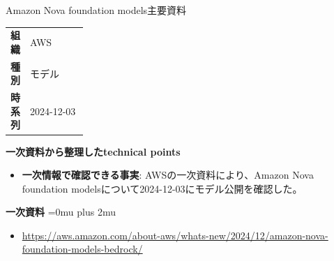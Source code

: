 \begin{technicalnote}{Amazon Nova foundation models}{主要資料}
\begingroup
\begin{tabularx}{\linewidth}{@{}>{\bfseries}p{0.22\linewidth}X@{}}
組織 & AWS \\
種別 & モデル \\
時系列 & 2024-12-03 \\
\end{tabularx}
\smallskip
{\bfseries 一次資料から整理したtechnical points}
\begin{itemize}[leftmargin=1.5em,itemsep=0.35em]
\item \textbf{一次情報で確認できる事実}: AWSの一次資料により、Amazon Nova foundation modelsについて2024-12-03にモデル公開を確認した。
\end{itemize}
\begin{minipage}{\linewidth}
\begin{samepage}
{\bfseries 一次資料}
\begingroup\sloppy
\Urlmuskip=0mu plus 2mu\relax
\begin{itemize}[leftmargin=1.5em,itemsep=0.25em]
\item {\scriptsize\url{https://aws.amazon.com/about-aws/whats-new/2024/12/amazon-nova-foundation-models-bedrock/}}
\end{itemize}
\endgroup
\end{samepage}
\end{minipage}
\endgroup
\end{technicalnote}
\medskip

